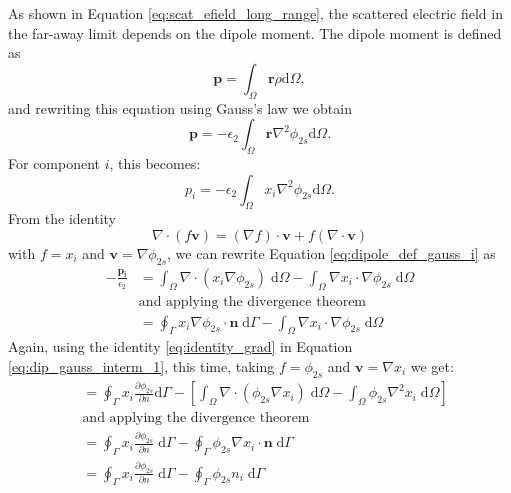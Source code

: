 As shown in Equation \eqref{eq:scat_efield_long_range}, the scattered electric 
field in the far-away limit depends on the dipole moment. The dipole moment is 
defined as 
%
\begin{equation} \label{eq:dipole_def}
\mathbf{p} = \int_\Omega \mathbf{r} \rho \text{d}\Omega,
\end{equation}
%
and rewriting this equation using Gauss's law we obtain
%
\begin{equation} \label{eq:dipole_def_gauss}
\mathbf{p} = -\epsilon_2\int_\Omega \mathbf{r} \nabla^2 \phi_{2s} \text{d}\Omega.
\end{equation}
%
For component $i$, this becomes:
%
\begin{equation} \label{eq:dipole_def_gauss_i}
{p_i} = -\epsilon_2\int_\Omega {x_i} \nabla^2 \phi_{2s} \text{d}\Omega.
\end{equation}
%
From the identity
%
\begin{equation} \label{eq:identity_grad}
\nabla \cdot \left(f \mathbf{v}\right) = \left( \nabla f \right)\cdot \mathbf{v} + f\left(\nabla \cdot \mathbf{v}\right)
\end{equation}
%
with $f=x_i$ and $\mathbf{v} = \nabla\phi_{2s}$, we can rewrite Equation \eqref{eq:dipole_def_gauss_i}
as 
%
\begin{align} \label{eq:dip_gauss_interm_1}
- \frac{\mathbf{p_i}}{\epsilon_2} &= \int_\Omega \nabla \cdot \left( x_i \nabla \phi_{2s} \right) \; \text{d}\Omega - \int_\Omega \nabla x_i \cdot \nabla\phi_{2s} \; \text{d}\Omega \nonumber \\
&\text{and applying the divergence theorem} \nonumber \\
&= \oint_\Gamma  x_i  \nabla \phi_{2s} \cdot \mathbf{n} \; \text{d}\Gamma - \int_\Omega \nabla x_i \cdot \nabla\phi_{2s} \; \text{d}\Omega
\end{align}
%
Again, using the identity \eqref{eq:identity_grad} in Equation \eqref{eq:dip_gauss_interm_1}, this time, 
taking $f=\phi_{2s}$ and $\mathbf{v} = \nabla x_i$ we get:
%
\begin{align} \label{eq:dip_gauss_interm_2}
 &= \oint_\Gamma  x_i  \frac{\partial \phi_{2s}}{\partial n} \text{d}\Gamma - \left[ \int_\Omega \nabla \cdot \left( \phi_{2s} \nabla x_i \right)\;\text{d}\Omega - \int_\Omega  \phi_{2s} \nabla^2 x_i \;\text{d}\Omega\right] \nonumber\\
&\text{and applying the divergence theorem} \nonumber \\
&= \oint_\Gamma  x_i  \frac{\partial \phi_{2s}}{\partial n} \; \text{d}\Gamma - \oint_\Gamma \phi_{2s} \nabla x_i \cdot \mathbf{n} \; \text{d}\Gamma \nonumber \\
&= \oint_\Gamma  x_i  \frac{\partial \phi_{2s}}{\partial n} \; \text{d}\Gamma - \oint_\Gamma \phi_{2s} n_i \;\text{d}\Gamma
\end{align}
